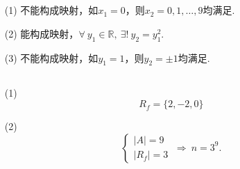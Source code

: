 \documentclass[UTF8]{ctexart}
\begin{document}
\fancyfoot[C]{\thepage}

\section{}
\subsection{}   %
\begin{enumerate}
    \item [(1)]不能构成映射，如$x_1=0$，则$x_2=0,1,\ldots,9$均满足.
    \item [(2)]能构成映射，$\forall\ y_1\in \mathbb{R},\ \exists !\ y_2 = y_1^2$.
    \item [(3)]不能构成映射，如$y_1 = 1$，则$y_2 = \pm 1$均满足.
\end{enumerate}

\subsection{}   %
\begin{enumerate}
    \item [(1)]
    \[
        R_f = \{ 2 , -2 , 0 \}    
    \]
    \item [(2)]
    \[
        \begin{cases}
            |A| = 9\\
            |R_f| = 3
        \end{cases}    
        \ \Rightarrow\ 
        n = 3^9.
    \]
\end{enumerate}
\end{document}
